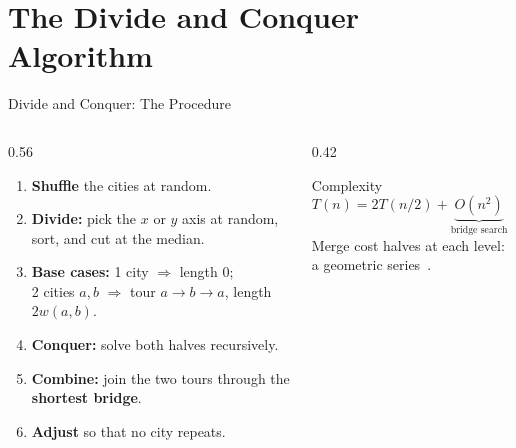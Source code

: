 \section{The Divide and Conquer Algorithm}

\begin{frame}{Divide and Conquer: The Procedure}
  \begin{columns}[T]
    \begin{column}{0.56\textwidth}
      \small
      \begin{enumerate}
        \item \textbf{Shuffle} the cities at random.
        \item \textbf{Divide:} pick the $x$ or $y$ axis at random, sort, and cut at the median.
        \item \textbf{Base cases:} 1 city $\Rightarrow$ length 0; \\
              2 cities $a,b$ $\Rightarrow$ tour $a\to b\to a$, length $2w(a,b)$.
        \item \textbf{Conquer:} solve both halves recursively.
        \item \textbf{Combine:} join the two tours through the \textbf{shortest bridge}.
        \item \textbf{Adjust} so that no city repeats.
      \end{enumerate}
    \end{column}
    \begin{column}{0.42\textwidth}
      \begin{block}{Complexity}
        \[ T(n) = 2T(n/2) + \underbrace{O(n^2)}_{\text{bridge search}} = O(n^2) \]
        \small Merge cost halves at each level: a geometric series~\cite{cormen2009introduction}.
      \end{block}
    \end{column}
  \end{columns}
\end{frame}

